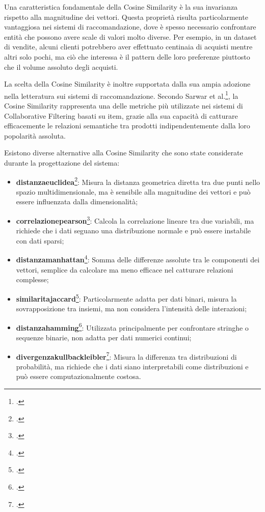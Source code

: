Una caratteristica fondamentale della Cosine Similarity è la sua invarianza rispetto alla magnitudine dei vettori. Questa proprietà risulta particolarmente vantaggiosa nei sistemi di raccomandazione, dove è spesso necessario confrontare entità che possono avere scale di valori molto diverse. Per esempio, in un dataset di vendite, alcuni clienti potrebbero aver effettuato centinaia di acquisti mentre altri solo pochi, ma ciò che interessa è il pattern delle loro preferenze piuttosto che il volume assoluto degli acquisti.

La scelta della Cosine Similarity è inoltre supportata dalla sua ampia adozione nella letteratura sui sistemi di raccomandazione. Secondo Sarwar et al.\footcite{article:item-based-collaborative-filtering}, la Cosine Similarity rappresenta una delle metriche più utilizzate nei sistemi di Collaborative Filtering basati su item, grazie alla sua capacità di catturare efficacemente le relazioni semantiche tra prodotti indipendentemente dalla loro popolarità assoluta.

Esistono diverse alternative alla Cosine Similarity che sono state considerate durante la progettazione del sistema:

\begin{itemize}
    \item \textbf{\gls{distanzaeuclidea}}\footcite{site:euclidean_distance}: Misura la distanza geometrica diretta tra due punti nello spazio multidimensionale, ma è sensibile alla magnitudine dei vettori e può essere influenzata dalla dimensionalità;
    \item \textbf{\gls{correlazionepearson}}\footcite{site:pearson_correlation_coefficient}: Calcola la correlazione lineare tra due variabili, ma richiede che i dati seguano una distribuzione normale e può essere instabile con dati sparsi;
    \item \textbf{\gls{distanzamanhattan}}\footcite{site:manhattan_distance}: Somma delle differenze assolute tra le componenti dei vettori, semplice da calcolare ma meno efficace nel catturare relazioni complesse;
    \item \textbf{\gls{similaritajaccard}}\footcite{site:jaccard_index}: Particolarmente adatta per dati binari, misura la sovrapposizione tra insiemi, ma non considera l'intensità delle interazioni;
    \item \textbf{\gls{distanzahamming}}\footcite{site:hamming_distance}: Utilizzata principalmente per confrontare stringhe o sequenze binarie, non adatta per dati numerici continui;
    \item \textbf{\gls{divergenzakullbackleibler}}\footcite{site:kullback-Leibler_divergence}: Misura la differenza tra distribuzioni di probabilità, ma richiede che i dati siano interpretabili come distribuzioni e può essere computazionalmente costosa.
\end{itemize}

